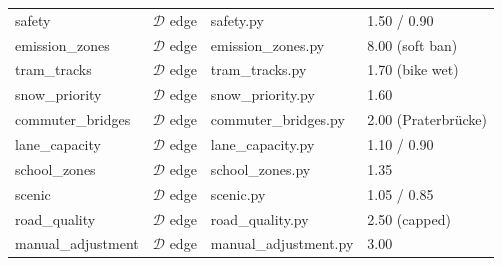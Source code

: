 \documentclass[11pt,a4paper]{article}
\begin{document}
\begin{table}[H]
\begin{tabular}{llll}
safety & $\mathcal{D}$ edge & safety.py & 1.50 / 0.90 \\
emission\_zones & $\mathcal{D}$ edge & emission\_zones.py & 8.00 (soft ban) \\
tram\_tracks & $\mathcal{D}$ edge & tram\_tracks.py & 1.70 (bike wet) \\
snow\_priority & $\mathcal{D}$ edge & snow\_priority.py & 1.60 \\
commuter\_bridges & $\mathcal{D}$ edge & commuter\_bridges.py & 2.00 (Praterbrücke) \\
lane\_capacity & $\mathcal{D}$ edge & lane\_capacity.py & 1.10 / 0.90 \\
school\_zones & $\mathcal{D}$ edge & school\_zones.py & 1.35 \\
scenic & $\mathcal{D}$ edge & scenic.py & 1.05 / 0.85 \\
road\_quality & $\mathcal{D}$ edge & road\_quality.py & 2.50 (capped) \\
manual\_adjustment & $\mathcal{D}$ edge & manual\_adjustment.py & 3.00 \\
\bottomrule
\end{tabular}
\end{table}
\end{document}
